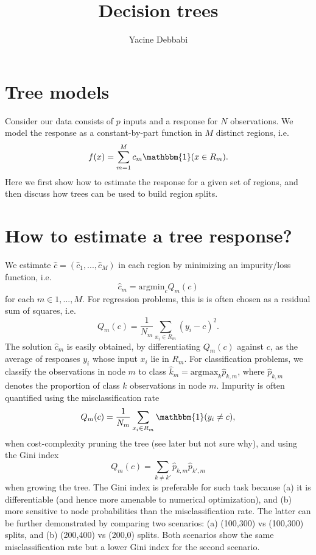 \documentclass[]{article}
\title{\textbf{Decision trees}}
\author{Yacine Debbabi}
\begin{document}
\maketitle

\tableofcontents


\section{Tree models}

Consider our data consists of $p$ inputs and a response for $N$ observations. We model the response as a constant-by-part function in $M$ distinct regions, i.e.
\begin{eqnarray}
f(x)=\sum_{m=1}^M c_m \mathbbm{1}(x\in R_m).
\end{eqnarray}
Here we first show how to estimate the response for a given set of regions, and then discuss how trees can be used to build region splits.

\section{How to estimate a tree response?}

We estimate $\hat{c}=(\hat{c}_1,...,\hat{c}_M)$ in each region by minimizing an impurity/loss function, i.e.
\begin{equation}
\hat{c}_m = \mathrm{argmin}_c Q_m(c)
\end{equation}
for each $m\in{1,...,M}$. For regression problems, this is is often chosen as a residual sum of squares, i.e.
\begin{equation}
Q_m(c) = \frac{1}{N_m}\sum_{x_i\in R_m} (y_i-c)^2.
\end{equation}
The solution $\hat{c}_m$ is easily obtained, by differentiating $Q_m(c)$ against $c$, as the average of responses $y_i$ whose input $x_i$ lie in $R_m$. For classification problems, we classify the observations in node $m$ to class $\hat{k}_m=\textrm{argmax}_k \hat{p}_{k,m}$, where $\hat{p}_{k,m}$ denotes the proportion of class $k$ observations in node $m$. Impurity is often quantified using the misclassification rate
\begin{equation}
Q_m(c) = \frac{1}{N_m}\sum_{x_i\in R_m} \mathbbm{1}(y_i \neq c),
\end{equation}
when cost-complexity pruning the tree (see later but not sure why), and using the Gini index
\begin{equation}
Q_m(c) = \sum_{k\neq k'} \hat{p}_{k,m}\hat{p}_{k',m}
\end{equation}
when growing the tree. The Gini index is preferable for such task because (a) it is differentiable (and hence more amenable to numerical optimization), and (b) more sensitive to node probabilities than the misclassification rate. The latter can be further demonstrated by comparing two scenarios: (a) (100,300) vs (100,300) splits, and (b) (200,400) vs (200,0) splits. Both scenarios show the same misclassification rate but a lower Gini index for the second scenario.
\end{document}
